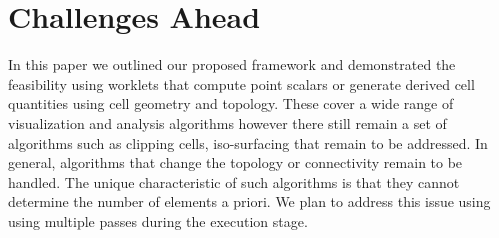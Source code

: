 \documentclass{vgtc}                          %
\newcommand*{\keyterm}[1]{\emph{#1}}
\begin{document}
\section{Challenges Ahead}
\label{sec:Challenges}

In this paper we outlined our proposed framework and demonstrated the
feasibility using worklets that compute point scalars or generate derived cell
quantities using cell geometry and topology. These cover a wide range of
visualization and analysis algorithms however there still remain a set of
algorithms such as clipping cells, iso-surfacing that remain to be addressed. In
general, algorithms that change the topology or connectivity remain to be
handled. The unique characteristic of such algorithms is that they cannot determine the
number of elements a priori. We plan to address this issue using using multiple
passes during the execution stage.






\end{document}
